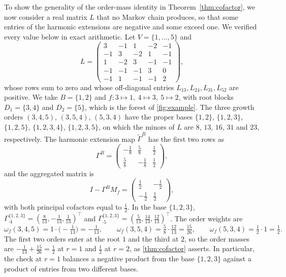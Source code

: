 \documentclass[onefignum,onetabnum,nohypdvips]{siamart250211}
\numberwithin{theorem}{section}
\numberwithin{equation}{section}
\begin{document}
\begin{example}\label{ex:signed}
To show the generality of the order-mass identity in Theorem~\ref{thm:cofactor}, we now consider a real matrix $L$ that no Markov chain produces, so
that some entries of the harmonic extensions are negative and some
exceed one. We verified every value below in exact arithmetic. Let
$V=\{1,\dots,5\}$ and
\[
L=\begin{pmatrix}
3&-1&1&-2&-1\\
-1&3&-2&1&-1\\
1&-2&3&-1&-1\\
-1&-1&-1&3&0\\
-1&1&-1&-1&2
\end{pmatrix},
\]
whose rows sum to zero and whose off-diagonal entries
$L_{13},L_{24},L_{31},L_{52}$ are positive. We take $B=\{1,2\}$ and
$f:3\mapsto1,\ 4\mapsto3,\ 5\mapsto2$, with root blocks $D_1=\{3,4\}$
and $D_2=\{5\}$, which is the forest of \cref{fig:example}. The three growth orders $(3,4,5)$, $(3,5,4)$, $(5,3,4)$
have the proper bases $\{1,2\}$, $\{1,2,3\}$, $\{1,2,5\}$, $\{1,2,3,4\}$,
$\{1,2,3,5\}$, on which the minors of $L$ are $8$, $13$, $16$, $31$
and $23$, respectively. The harmonic extension map $\tilde\Gamma^B$ has the first two rows as
\[
\Gamma^{B}=\begin{pmatrix}-\tfrac18&\tfrac58&\tfrac12\\[2pt]
\tfrac58&-\tfrac18&\tfrac12\end{pmatrix},
\]
and the aggregated matrix is
\[I-\Gamma^BM_f
=\left(\begin{smallmatrix}\frac12&-\frac12\\-\frac12&\frac12\end{smallmatrix}\right),\]
with both principal cofactors equal to $\tfrac12$. In the base
$\{1,2,3\}$,
$\Gamma^{\{1,2,3\}}_{\cdot4}=(\tfrac8{13},-\tfrac1{13},\tfrac1{13})^{\top}$
and
$\Gamma^{\{1,2,3\}}_{\cdot5}=(\tfrac5{13},\tfrac{14}{13},\tfrac{12}{13})^{\top}$. The order weights are
\[
\omega_f(3,4,5)= 1\cdot\big(-\tfrac1{13}\big)=-\tfrac1{13},\qquad
\omega_f(3,5,4)= \tfrac58\cdot\tfrac{12}{13}=\tfrac{15}{26},\qquad
\omega_f(5,3,4)= \tfrac12\cdot1=\tfrac12 .
\]
The first two orders enter at the root $1$ and the third at $2$, so the
order masses are $-\tfrac1{13}+\tfrac{15}{26}=\tfrac12$ at $r=1$ and
$\tfrac12$ at $r=2$, as \cref{thm:cofactor} asserts. In particular, the
check at $r=1$ balances a negative product from the base $\{1,2,3\}$ against a
product of entries from two different bases.
\end{example}
\end{document}
